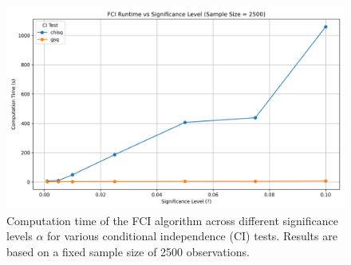 \begin{figure}[htbp]
    \centering
    \includegraphics[width=1\textwidth]{Report/final_report/pictures/fci_runtime_vs_alpha.png}
    \caption{Computation time of the FCI algorithm across different significance levels $\alpha$ for various conditional independence (CI) tests. Results are based on a fixed sample size of 2500 observations.}
    \label{fig:fci_runtime_vs_alpha}
\end{figure}
